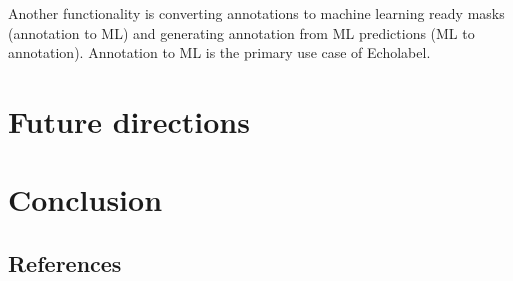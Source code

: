 \documentclass[
  10pt,
  letterpaper,
]{article}
\begin{document}
Another functionality is converting annotations to machine learning
ready masks (annotation to ML) and generating annotation from ML
predictions (ML to annotation). Annotation to ML is the primary use case
of Echolabel.

\section{Future directions}\label{future-directions}

\section{Conclusion}\label{conclusion}

\subsection*{References}\label{references}

\renewcommand{\bibsection}{}



\nolinenumbers
\end{document}

